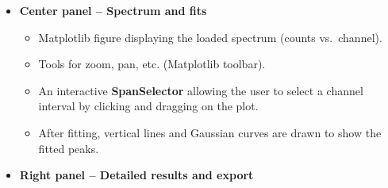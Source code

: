 \begin{itemize}
\begin{itemize}
    \begin{itemize}
    \tightlist
    \item
      Table with one row per identified calibration peak.\\
    \item
      Columns:

      \begin{itemize}
      \tightlist
      \item
        Index (internal peak number)\\
      \item
        \textbf{Channel} (fitted centroid)\\
      \item
        \textbf{Energy (keV)} (reference value entered by the user)
      \end{itemize}
    \end{itemize}
  \item
    \textbf{Peak management buttons}

    \begin{itemize}
    \tightlist
    \item
      \textbf{Delete selected peak}: removes the highlighted peak from
      the list and from the internal data.\\
    \item
      \textbf{Clear all peaks}: removes all peaks and resets the
      calibration state.
    \end{itemize}
  \item
    \textbf{Calibration controls}

    \begin{itemize}
    \tightlist
    \item
      \textbf{Run calibration} button (enabled when at least two peaks
      are defined).\\
    \item
      Label showing the calibration result or a message such as
      ``Minimum 2 peaks required''.
    \end{itemize}
  \end{itemize}
\item
  \textbf{Center panel -- Spectrum and fits}

  \begin{itemize}
  \tightlist
  \item
    Matplotlib figure displaying the loaded spectrum (counts
    vs.~channel).\\
  \item
    Tools for zoom, pan, etc. (Matplotlib toolbar).\\
  \item
    An interactive \textbf{SpanSelector} allowing the user to select a
    channel interval by clicking and dragging on the plot.
  \item
    After fitting, vertical lines and Gaussian curves are drawn to show
    the fitted peaks.
  \end{itemize}
\item
  \textbf{Right panel -- Detailed results and export}


\end{itemize}
